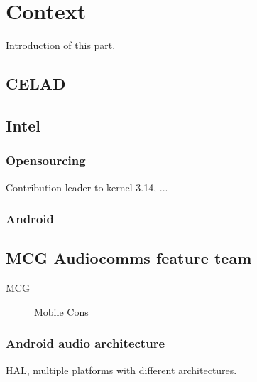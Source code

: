 \chapter{Context}

Introduction of this part.

\section{CELAD}

\section{Intel}
\subsection{Opensourcing}
Contribution leader to kernel 3.14, ...

\subsection{Android}

\section{MCG Audiocomms feature team}
\begin{description}
    \item[MCG] Mobile Cons
\end{description}

\subsection{Android audio architecture}
HAL, multiple platforms with different architectures.
